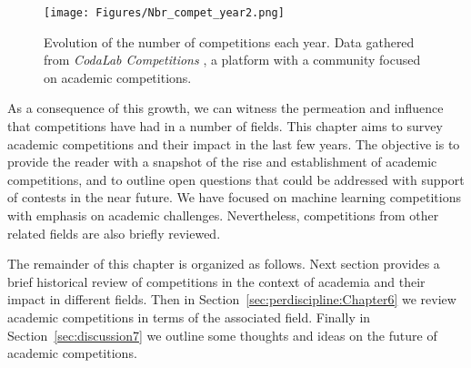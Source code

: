 \documentclass[twoside,11pt]{article}
\begin{document}
\begin{figure}[h]
    \centering
    \texttt{[image: Figures/Nbr\_compet\_year2.png]}
    \caption{Evolution of the number of competitions each year. Data gathered from {\em CodaLab Competitions} \citep{codalab_competitions_JMLR}, a platform with a community focused on academic competitions. %
    } 
    \label{fig:nbr_compet_years}
\end{figure}


As a consequence of this growth,  we can witness the permeation and influence that competitions have had in a number of fields.
This chapter aims to survey academic competitions and their impact in the last few years. The objective is to provide the reader with a snapshot of the rise and establishment of academic competitions, and to outline open questions that could be addressed with support of contests in the near future. We have focused on machine learning competitions with emphasis on academic challenges. Nevertheless, competitions from other related fields are also briefly reviewed. 

The remainder of this chapter is organized as follows. Next section provides a brief historical review of competitions in the context of academia and their impact in different fields. %
Then in Section~\ref{sec:perdiscipline:Chapter6} we review academic competitions in terms of the associated field. Finally in Section~\ref{sec:discussion7} we outline some thoughts and ideas on the future of academic competitions. 
\end{document}
